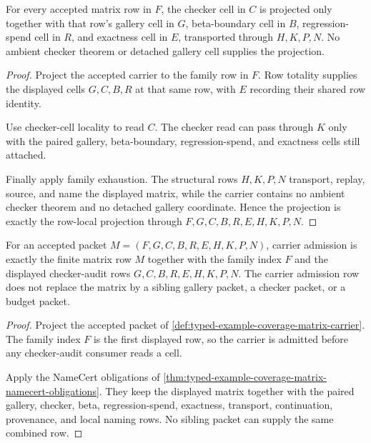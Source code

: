 \begin{theorem}
\label{thm:typed-example-coverage-matrix-family-checker-projection}
For every accepted matrix row in $F$, the checker cell in $C$ is projected only together with that row's gallery cell in $G$, beta-boundary cell in $B$, regression-spend cell in $R$, and exactness cell in $E$, transported through $H,K,P,N$. No ambient checker theorem or detached gallery cell supplies the projection.
\end{theorem}
\begin{proof}
Project the accepted carrier to the family row in $F$. Row totality supplies the displayed cells $G,C,B,R$ at that same row, with $E$ recording their shared row identity.

Use checker-cell locality to read $C$. The checker read can pass through $K$ only with the paired gallery, beta-boundary, regression-spend, and exactness cells still attached.

Finally apply family exhaustion. The structural rows $H,K,P,N$ transport, replay, source, and name the displayed matrix, while the carrier contains no ambient checker theorem and no detached gallery coordinate. Hence the projection is exactly the row-local projection through $F,G,C,B,R,E,H,K,P,N$.
\end{proof}
\begin{theorem}
\label{thm:typed-example-coverage-matrix-carrier-admission}
For an accepted packet $M=(F,G,C,B,R,E,H,K,P,N)$, carrier admission is exactly the finite matrix row $M$ together with the family index $F$ and the displayed checker-audit rows $G,C,B,R,E,H,K,P,N$. The carrier admission row does not replace the matrix by a sibling gallery packet, a checker packet, or a budget packet.
\end{theorem}
\begin{proof}
Project the accepted packet of \autoref{def:typed-example-coverage-matrix-carrier}. The family index $F$ is the first displayed row, so the carrier is admitted before any checker-audit consumer reads a cell.

Apply the NameCert obligations of \autoref{thm:typed-example-coverage-matrix-namecert-obligations}. They keep the displayed matrix together with the paired gallery, checker, beta, regression-spend, exactness, transport, continuation, provenance, and local naming rows. No sibling packet can supply the same combined row.
\end{proof}
